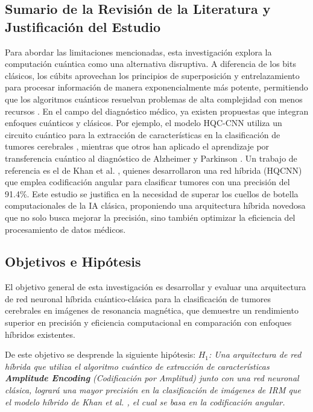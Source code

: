 \subsection*{Sumario de la Revisión de la Literatura y Justificación del Estudio}

\justify
Para abordar las limitaciones mencionadas, esta investigación explora la computación cuántica como una alternativa disruptiva. A diferencia de los bits clásicos, los cúbits aprovechan los principios de superposición y entrelazamiento para procesar información de manera exponencialmente más potente, permitiendo que los algoritmos cuánticos resuelvan problemas de alta complejidad con menos recursos \cite{mcmahon2008}. En el campo del diagnóstico médico, ya existen propuestas que integran enfoques cuánticos y clásicos. Por ejemplo, el modelo HQC-CNN utiliza un circuito cuántico para la extracción de características en la clasificación de tumores cerebrales \cite{HQC-CNN}, mientras que otros han aplicado el aprendizaje por transferencia cuántico al diagnóstico de Alzheimer y Parkinson \cite{math11020376}. Un trabajo de referencia es el de Khan et al. \cite{khan2024brain}, quienes desarrollaron una red híbrida (HQCNN) que emplea codificación angular para clasificar tumores con una precisión del 91.4\%. Este estudio se justifica en la necesidad de superar los cuellos de botella computacionales de la IA clásica, proponiendo una arquitectura híbrida novedosa que no solo busca mejorar la precisión, sino también optimizar la eficiencia del procesamiento de datos médicos.

\subsection*{Objetivos e Hipótesis}

El objetivo general de esta investigación es desarrollar y evaluar una arquitectura de red neuronal híbrida cuántico-clásica para la clasificación de tumores cerebrales en imágenes de resonancia magnética, que demuestre un rendimiento superior en precisión y eficiencia computacional en comparación con enfoques híbridos existentes.

De este objetivo se desprende la siguiente hipótesis:
\textit{$H_1$: Una arquitectura de red híbrida que utiliza el algoritmo cuántico de extracción de características \textbf{Amplitude Encoding} (Codificación por Amplitud) \cite{nakaji2022approximate} junto con una red neuronal clásica, logrará una mayor precisión en la clasificación de imágenes de IRM que el modelo híbrido de Khan et al. \cite{khan2024brain}, el cual se basa en la codificación angular.}

